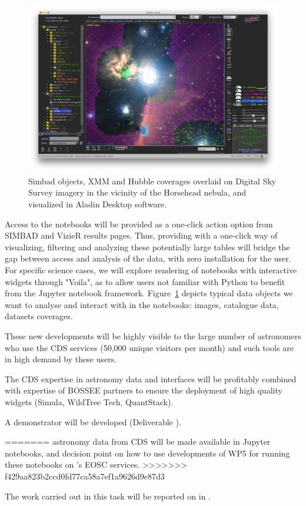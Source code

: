 \begin{task}[
  title=Demonstrator: Astronomy,
  id=astro,
  lead=CDS,
  PM=18,
  wphases={18-42},
  partners={EGI,INSERM,QS,SRL,WTT,XFEL}
]
\begin{figure}[ht!]\centering
  \includegraphics[width=1.0\textwidth]{astro-aladin-snapshot}
  \caption{Simbad objects, XMM and Hubble coverages overlaid on Digital Sky Survey imagery in the vicinity of the Horsehead nebula, and visualized in Aladin Desktop software.}\label{fig:astro-aladin-snapshot}
\end{figure}

  Access to the notebooks will be provided as a one-click action option from
  SIMBAD and VizieR results pages.
  Thus, providing with a one-click way of visualizing, filtering and analyzing
these potentially large tables will bridge the gap between access and analysis
of the data, with zero installation for the user.
  For specific science cases, we will explore rendering of notebooks with
  interactive widgets through "Voila", as to allow users not familiar with
  Python to benefit from the Jupyter notebook framework.
  Figure~\ref{fig:astro-aladin-snapshot} depicts typical data objects we want to analyse and interact with in the notebooks: images, catalogue data, datasets coverages.

  These new developments will be highly visible to the large number of astronomers who use the CDS services (50,000 unique visitors per month) and such tools are in high demand by these users.

  The CDS expertise in astronomy data and interfaces will be profitably combined with expertise of BOSSEE partners to ensure the deployment of high quality widgets (Simula, WildTree Tech, QuantStack).

  A demonstrator will be developed (Deliverable ).

=======
  astronomy data from CDS will be made available in Jupyter notebooks, and
  decision point on how to use developments of WP5 for running these
  notebooks on \TheProject's EOSC services.
>>>>>>> f429aa823b2ccd0fd77ca58a7ef1a9626d9e87d3

  The work carried out in this task will be reported on in
  .
\end{task}
